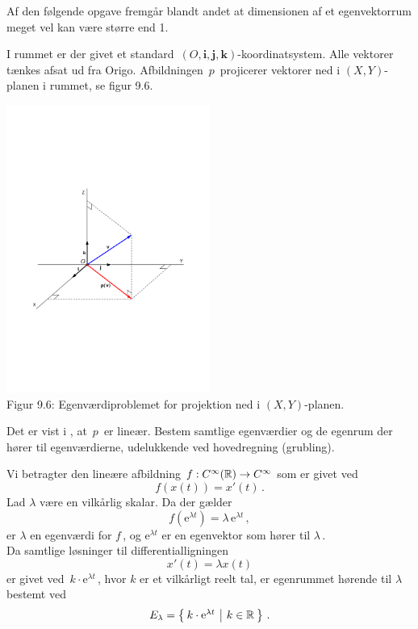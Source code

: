 Af den følgende opgave fremgår blandt andet at dimensionen af et egenvektorrum meget vel kan være større end 1. 

\begin{exercise}\label{evProjektion}
I rummet er der givet et standard $\,(O,\mathbf i,\mathbf j,\mathbf k)$-koordinatsystem. Alle vektorer tænkes afsat ud fra Origo. Afbildningen $\,p\,$ projicerer vektorer ned i $(X,Y)$-planen i rummet, se figur 9.6.

\begin{center}
		\includegraphics[trim=2cm 8cm 2cm
 8cm,width=0.50\textwidth,clip]{projektion.pdf}
  \\Figur 9.6: Egenværdiproblemet for projektion ned i  $(X,Y)$-planen.
\end{center}

Det er vist i , at $\,p\,$ er lineær. Bestem samtlige egenværdier og de egenrum der hører til egenværdierne, udelukkende ved hovedregning (grubling).
\end{exercise}

\begin{example}\label{evExponential}
Vi betragter den lineære afbildning $f:C^{\infty}(\mathbb{R})\rightarrow C^{\infty}$ som er givet ved
$$
f(x(t))=x'(t)\,.
$$
Lad $\lambda$ være en vilkårlig skalar. Da der gælder
$$
f(\mathrm{e}^{\lambda t})=\lambda\,\mathrm{e}^{\lambda t}\,,
$$
er $\lambda$ en egenværdi for $f\,$, og $\mathrm e ^{\lambda t}$ er en egenvektor som hører til $\lambda\,$.\\

Da samtlige løsninger til differentialligningen
$$x'(t)=\lambda x(t)$$
er givet ved $\,k\cdot \mathrm{e}^{\lambda t}\,$, hvor $k$ er et vilkårligt reelt tal, er egenrummet hørende til $\lambda$ bestemt ved
$$E_{\lambda}= \left\lbrace \hspace*{-1mm} \begin{array}{c|c} k\cdot\mathrm{e}^{\lambda t}  &  k \in \mathbb{R} \end{array} \hspace*{-1mm} \right\rbrace\,.$$
\end{example}

